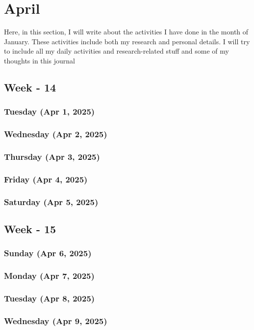 \chapter{April}
\hspace{1cm}
Here, in this section, I will write about the activities I have done in the month of January. These activities include both my research and personal details. I will try to include all my daily activities and research-related stuff and some of my thoughts in this journal \cite{zhou2015}

\section{Week - 14}
\subsection*{Tuesday (Apr 1, 2025)}
\subsection*{Wednesday (Apr 2, 2025)}
\subsection*{Thursday (Apr 3, 2025)}
\subsection*{Friday (Apr 4, 2025)}
\subsection*{Saturday (Apr 5, 2025)}

\section{Week - 15}
\subsection*{Sunday (Apr 6, 2025)}
\subsection*{Monday (Apr 7, 2025)}
\subsection*{Tuesday (Apr 8, 2025)}
\subsection*{Wednesday (Apr 9, 2025)}
